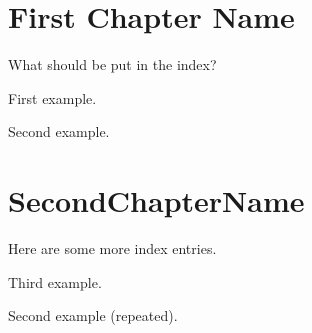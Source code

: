 \documentclass{book}
\begin{document}
\chapter{First Chapter Name}


What should be put in the index?

\ex First example.
\xe

\ex Second example.
\xe



\chapter{SecondChapterName}

Here are some more index entries.

\ex Third example.
\xe

\ex Second example (repeated).
\xe

\printindex
\end{document}
